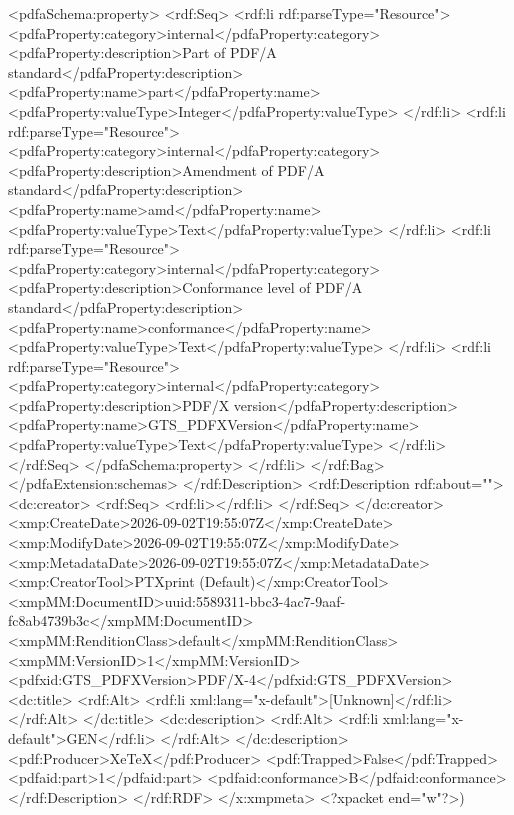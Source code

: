 {              <pdfaSchema:property>
                <rdf:Seq>
                  <rdf:li rdf:parseType="Resource">
                    <pdfaProperty:category>internal</pdfaProperty:category>
                    <pdfaProperty:description>Part of PDF/A standard</pdfaProperty:description>
                    <pdfaProperty:name>part</pdfaProperty:name>
                    <pdfaProperty:valueType>Integer</pdfaProperty:valueType>
                  </rdf:li>
                  <rdf:li rdf:parseType="Resource">
                    <pdfaProperty:category>internal</pdfaProperty:category>
                    <pdfaProperty:description>Amendment of PDF/A standard</pdfaProperty:description>
                    <pdfaProperty:name>amd</pdfaProperty:name>
                    <pdfaProperty:valueType>Text</pdfaProperty:valueType>
                  </rdf:li>
                  <rdf:li rdf:parseType="Resource">
                    <pdfaProperty:category>internal</pdfaProperty:category>
                    <pdfaProperty:description>Conformance level of PDF/A standard</pdfaProperty:description>
                    <pdfaProperty:name>conformance</pdfaProperty:name>
                    <pdfaProperty:valueType>Text</pdfaProperty:valueType>
                  </rdf:li>
                  <rdf:li rdf:parseType="Resource">
                    <pdfaProperty:category>internal</pdfaProperty:category>
                    <pdfaProperty:description>PDF/X version</pdfaProperty:description>
                    <pdfaProperty:name>GTS_PDFXVersion</pdfaProperty:name>
                    <pdfaProperty:valueType>Text</pdfaProperty:valueType>
                  </rdf:li>
                </rdf:Seq>
              </pdfaSchema:property>
            </rdf:li>
          </rdf:Bag>
        </pdfaExtension:schemas>
      </rdf:Description>
      <rdf:Description rdf:about="">
        <dc:creator>
          <rdf:Seq>
            <rdf:li></rdf:li>
          </rdf:Seq>
        </dc:creator>
        <xmp:CreateDate>2026-09-02T19:55:07Z</xmp:CreateDate>
        <xmp:ModifyDate>2026-09-02T19:55:07Z</xmp:ModifyDate>
        <xmp:MetadataDate>2026-09-02T19:55:07Z</xmp:MetadataDate>
        <xmp:CreatorTool>PTXprint (Default)</xmp:CreatorTool>
        <xmpMM:DocumentID>uuid:5589311-bbc3-4ac7-9aaf-fc8ab4739b3c</xmpMM:DocumentID>
        <xmpMM:RenditionClass>default</xmpMM:RenditionClass>
        <xmpMM:VersionID>1</xmpMM:VersionID>
        <pdfxid:GTS_PDFXVersion>PDF/X-4</pdfxid:GTS_PDFXVersion>
        <dc:title>
          <rdf:Alt>
            <rdf:li xml:lang="x-default">[Unknown]</rdf:li>
          </rdf:Alt>
        </dc:title>
        <dc:description>
          <rdf:Alt>
            <rdf:li xml:lang="x-default">GEN</rdf:li>
          </rdf:Alt>
        </dc:description>
        <pdf:Producer>XeTeX</pdf:Producer>
        <pdf:Trapped>False</pdf:Trapped>
      <pdfaid:part>1</pdfaid:part>
      <pdfaid:conformance>B</pdfaid:conformance>
      </rdf:Description>
  </rdf:RDF>
</x:xmpmeta>
<?xpacket end="w"?>)}
